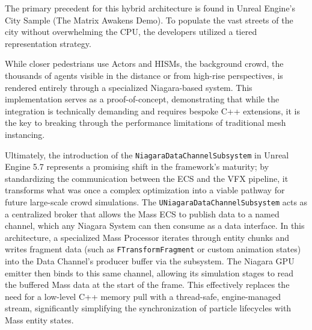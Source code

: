 The primary precedent for this hybrid architecture is found in Unreal Engine’s City Sample (The Matrix Awakens Demo). To populate the vast streets of the city without overwhelming the CPU, the developers utilized a tiered representation strategy.

While closer pedestrians use Actors and HISMs, the background crowd, the thousands of agents visible in the distance or from high-rise perspectives, is rendered entirely through a specialized Niagara-based system. This implementation serves as a proof-of-concept, demonstrating that while the integration is technically demanding and requires bespoke C++ extensions, it is the key to breaking through the performance limitations of traditional mesh instancing.

Ultimately, the introduction of the \texttt{NiagaraDataChannelSubsystem} in Unreal Engine 5.7 represents a promising shift in the framework’s maturity; by standardizing the communication between the ECS and the VFX pipeline, it transforms what was once a complex optimization into a viable pathway for future large-scale crowd simulations.
The \texttt{UNiagaraDataChannelSubsystem} acts as a centralized broker that allows the Mass ECS to publish data to a named channel, which any Niagara System can then consume as a data interface. In this architecture, a specialized Mass Processor iterates through entity chunks and writes fragment data (such as \texttt{FTransformFragment} or custom animation states) into the Data Channel's producer buffer via the subsystem.
The Niagara GPU emitter then binds to this same channel, allowing its simulation stages to read the buffered Mass data at the start of the frame. This effectively replaces the need for a low-level C++ memory pull with a thread-safe, engine-managed stream, significantly simplifying the synchronization of particle lifecycles with Mass entity states.
